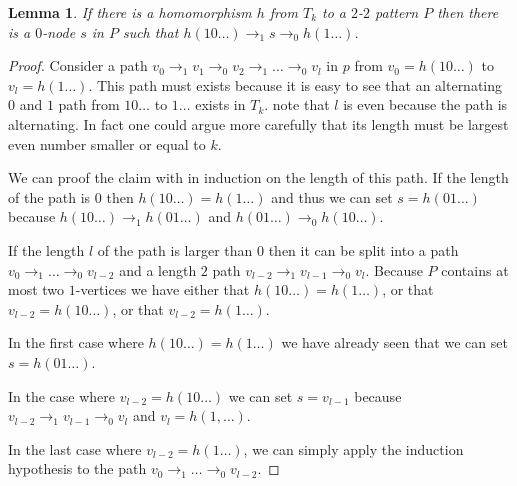 \documentclass[a4paper]{article}
\newtheorem{lemma}[theorem]{Lemma}
\begin{document}
\begin{lemma} \label{between lemma}
 If there is a homomorphism $h$ from $T_k$ to a $2$-$2$ pattern $P$ then
there is a $0$-node $s$ in $P$ such that $h(10\dots) \rightarrow_1
s \rightarrow_0 h(1\dots)$.
\end{lemma}
\begin{proof}
Consider a path $v_0 \rightarrow_1 v_1 \rightarrow_0
v_2 \rightarrow_1 \dots \rightarrow_0 v_l$ in $p$ from $v_0 =
h(10\dots)$ to $v_l = h(1\dots)$. This path must exists because it is
easy to see that an alternating $0$ and $1$ path from $10\dots$ to
$1\dots$ exists in $T_k$. note that $l$ is even because the path is
alternating. In fact one could argue more carefully that its length must
be largest even number smaller or equal to $k$.

We can proof the claim with in induction on the length of this path. If
the length of the path is $0$ then $h(10\dots) = h(1\dots)$ and thus we
can set $s = h(01\dots)$ because $h(10\dots) \rightarrow_1 h(01\dots)$
and $h(01\dots) \rightarrow_0 h(10\dots)$.

If the length $l$ of the path is larger than $0$ then it can be split
into a path $v_0 \rightarrow_1 \dots \rightarrow_0 v_{l - 2}$ and a
length $2$ path $v_{l - 2} \rightarrow_1 v_{l - 1} \rightarrow_0 v_l$.
Because $P$ contains at most two $1$-vertices we have either that
$h(10\dots) = h(1\dots)$, or that $v_{l - 2} = h(10\dots)$, or that
$v_{l - 2} = h(1\dots)$.

In the first case where $h(10\dots) = h(1\dots)$ we have already seen that we
can set $s = h(01\dots)$.

In the case where $v_{l - 2} = h(10\dots)$ we can set $s = v_{l - 1}$
because $v_{l - 2} \rightarrow_1 v_{l - 1} \rightarrow_0 v_l$ and $v_l =
h(1,\dots)$.

In the last case where $v_{l - 2} = h(1\dots)$, we can simply apply the
induction hypothesis to the path $v_0 \rightarrow_1 \dots \rightarrow_0
v_{l - 2}$.
\end{proof}
\end{document}
